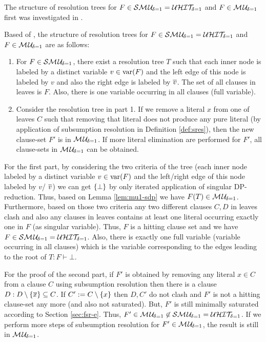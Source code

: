 \documentclass{report}
\begin{document}
The structure of resolution trees for $F \in \mathcal{S}\mathcal{M\hspace{0.8pt}U}_{\!\delta=1}=\mathcal{U}\mathcal{HIT}_{\!\!\delta=1} $ and  $F \in \mathcal{M\hspace{0.8pt}U}_{\!\delta=1}$ first was investigated in \cite{KullmannZhao2016UHitSAT}. 
\begin{lem}\label{lem:mu1-build}
Based of \cite{KullmannZhao2016UHitSAT}, the structure of resolution trees  for $F \in \mathcal{S}\mathcal{M\hspace{0.8pt}U}_{\!\delta=1}=\mathcal{U}\mathcal{HIT}_{\!\!\delta=1} $ and  $F \in \mathcal{M\hspace{0.8pt}U}_{\!\delta=1}$ are as follows:
  \begin{enumerate}
  \item For $F \in \mathcal{S}\mathcal{M\hspace{0.8pt}U}_{\!\delta=1}$, there exist a resolution tree $T$ such that each inner node is labeled by a distinct variable $v \in \operatorname{var}(F)$ and the left edge of this node is labeled by $v$ and also the right edge is labeled by $\overline v$. The set of all clauses in leaves is $F$. Also, there is one variable occurring in all clauses (full variable). 
  \item Consider the resolution tree in part 1. If we remove a literal $x$ from one of leaves $C$ such that removing that literal does not produce any pure literal (by application of subsumption resolution in Definition \ref{def:sres}), then the new clause-set $F'$ is in $ \mathcal{M\hspace{0.8pt}U}_{\!\delta=1}$. If more literal elimination are performed for $F'$, all clause-sets in $ \mathcal{M\hspace{0.8pt}U}_{\!\delta=1}$ can be obtained.
  \end{enumerate}
\end{lem}
\begin{prf}
For the first part, by considering the two criteria of the tree (each inner node labeled by a distinct variable $v \in \operatorname{var}(F)$ and the left/right edge of this node labeled by $v$/ $\overline v$) we can get $\{ \bot \}$ by only iterated application of singular DP-reduction. Thus, based on Lemma \ref{lem:mu1-sdp} we have $F(T) \in  \mathcal{M\hspace{0.8pt}U}_{\!\delta=1}$. Furthermore, based on those two criteria any two different clauses $C,D$ in leaves clash and also any clauses in leaves contains at least one literal occurring exactly one in $F$ (as singular variable). Thus, $F$ is a hitting clause set and we have $F \in \mathcal{S}\mathcal{M\hspace{0.8pt}U}_{\!\delta=1}=\mathcal{U}\mathcal{HIT}_{\!\!\delta=1} $. Also, there is exactly one full variable (variable occurring in all clauses) which is the variable corresponding to the edges leading to the root of $T:F \vdash \bot$.
 
For the proof of the second part, if $F'$ is obtained by removing any literal $x \in C$ from a clause $C$ using subsumption resolution then there is a clause $D:D \setminus \{ \overline x \} \subseteq C$. If $C':=C \setminus \{ x \}$ then $D,C'$ do not clash and $F'$ is not a hitting clause-set any more (and also not saturated). But, $F'$ is still minimally saturated according to Section \ref{sec:fsr-e}. Thus, $F'\in  \mathcal{M\hspace{0.8pt}U}_{\!\delta=1} \not \in \mathcal{S}\mathcal{M\hspace{0.8pt}U}_{\!\delta=1}=\mathcal{U}\mathcal{HIT}_{\!\!\delta=1}$. If we perform more steps of subsumption resolution for $F'\in  \mathcal{M\hspace{0.8pt}U}_{\!\delta=1}$, the result is still in $ \mathcal{M\hspace{0.8pt}U}_{\!\delta=1}$. %
\end{prf}
\end{document}

